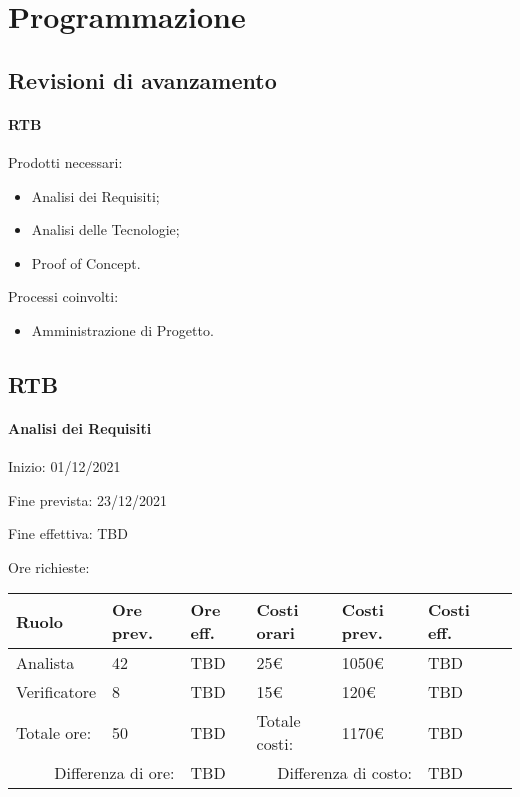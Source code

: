 \documentclass[a4paper, 12pt]{article}
\begin{document}
\makefrontpage

\makeversioni

\section{Programmazione}
\subsection{Revisioni di avanzamento}
\paragraph{RTB}
Prodotti necessari:
\begin{itemize}
\item Analisi dei Requisiti;
\item Analisi delle Tecnologie;
\item Proof of Concept.
\end{itemize}
Processi coinvolti:
\begin{itemize}
\item Amministrazione di Progetto.
\end{itemize}


\subsection{RTB}
\paragraph{Analisi dei Requisiti}
Inizio: 01/12/2021\par
Fine prevista: 23/12/2021\par
Fine effettiva: TBD

Ore richieste:\\[0.5em]
\begin{tabular}{|l|l|l||l|l|l|l|}\hline
Ruolo & Ore prev. & Ore eff. & Costi orari & Costi prev. & Costi eff.\\\hline
Analista & 42 & TBD & 25\euro & 1050\euro & TBD \\\hline
Verificatore & 8 & TBD & 15\euro & 120\euro & TBD \\\hline
Totale ore: & 50 & TBD & Totale costi: & 1170\euro & TBD \\\hline
\multicolumn{2}{|r|}{Differenza di ore:} & TBD & \multicolumn{2}{r|}{Differenza di costo:} & TBD \\\hline
\end{tabular}
\end{document}
